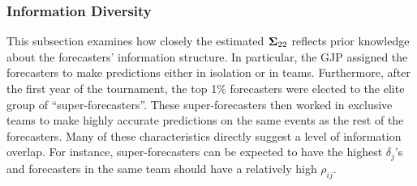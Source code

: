 \documentclass[11pt]{article}
\theoremstyle{definition}
\theoremstyle{definition}
\def\bSigma{{\bf \Sigma}}
\begin{document}
\subsubsection{Information Diversity}

This subsection examines how closely the estimated $\bSigma_{22}$ reflects prior knowledge about the forecasters' information structure. 
 In particular, the GJP assigned the forecasters to make predictions either in isolation or in teams. Furthermore, after the first year of the tournament, the top 1\% forecasters were elected to the elite group of ``super-forecasters''. These super-forecasters then worked in exclusive teams to make highly accurate predictions on the same events as the rest of the forecasters. Many of these characteristics directly suggest a level of information overlap. For instance, super-forecasters can be expected to have the highest $\delta_j$'s and forecasters in the same team should have a relatively high $\rho_{ij}$. 

\end{document}
